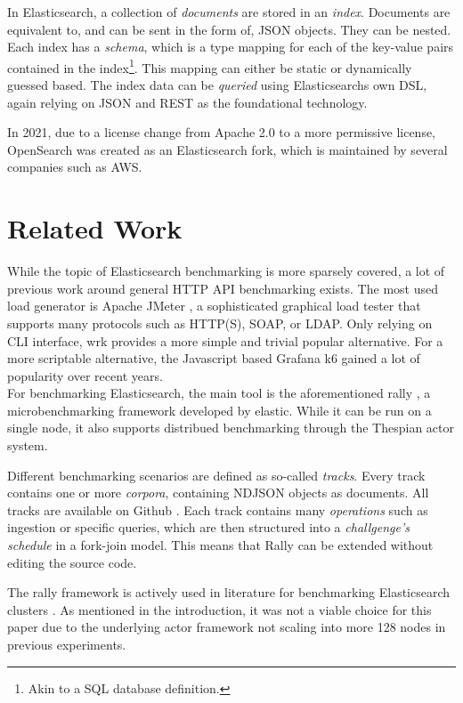 In Elasticsearch, a collection of \emph{documents} are stored in an \emph{index}. Documents are equivalent to, and can be sent in the form of, JSON objects. They can be nested. Each index has a \emph{schema}, which is a type mapping for each of the key-value pairs contained in the index\footnote{Akin to a SQL database definition.}. This mapping can either be static or dynamically guessed based. The index data can be \emph{queried} using Elasticsearchs own \ac{DSL}, again relying on JSON and REST as the foundational technology.

In 2021, due to a license change from Apache 2.0 to a more permissive license, OpenSearch was created as an Elasticsearch fork, which is maintained by several companies such as AWS.

\section{Related Work}
While the topic of Elasticsearch benchmarking is more sparsely covered, a lot of previous work around general HTTP API benchmarking exists. The most used load generator is Apache JMeter \cite{jmeter}, a sophisticated graphical load tester that supports many protocols such as HTTP(S), SOAP, or LDAP. Only relying on \ac{CLI} interface, wrk \cite{wrk} provides a more simple and trivial popular alternative. For a more scriptable alternative, the Javascript based Grafana k6 \cite{k6} gained a lot of popularity over recent years.\\

For benchmarking Elasticsearch, the main tool is the aforementioned rally \cite{rally}, a microbenchmarking framework developed by elastic. While it can be run on a single node, it also supports distribued benchmarking through the Thespian actor system.

Different benchmarking scenarios are defined as so-called \emph{tracks}. Every track contains one or more \emph{corpora}, containing \ac{NDJSON} objects as documents. All tracks are available on Github \cite{rallytracks}. Each track contains many \emph{operations} such as ingestion or specific queries, which are then structured into a \emph{challgenge's} \emph{schedule} in a fork-join model. This means that Rally can be extended without editing the source code.

The rally framework is actively used in literature for benchmarking Elasticsearch clusters \cite{rallyusecase1} \cite{rallyusecase2} \cite{rallyusecase3}. As mentioned in the introduction, it was not a viable choice for this paper due to the underlying actor framework not scaling into more 128 nodes in previous experiments.\\

